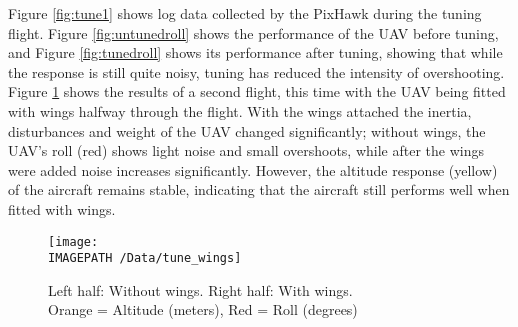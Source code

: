 Figure \ref{fig:tune1} shows log data collected by the PixHawk during the tuning flight. Figure \ref{fig:untunedroll} shows the performance of the UAV before tuning, and Figure \ref{fig:tunedroll} shows its performance after tuning, showing that while the response is still quite noisy, tuning has reduced the intensity of overshooting. Figure \ref{fig:tune2} shows the results of a second flight, this time with the UAV being fitted with wings halfway through the flight. With the wings attached the inertia, disturbances and weight of the UAV changed significantly; without wings, the UAV's roll (red) shows light noise and small overshoots, while after the wings were added noise increases significantly. However, the altitude response (yellow) of the aircraft remains stable, indicating that the aircraft still performs well when fitted with wings.

\begin{figure}[!ht]
	\centering
	\texttt{[image: \\IMAGEPATH /Data/tune\_wings]}
	\caption{Left half: Without wings. Right half: With wings.\\ Orange = Altitude (meters), Red = Roll (degrees)}
	\label{fig:tune2}
\end{figure}